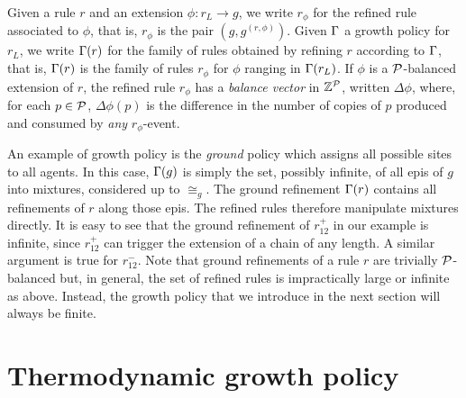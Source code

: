 \label{p:balance-vector}
Given a rule $r$ and an extension $\phi: r_L \to g$, %
we write $r_\phi$ for the refined rule associated to $\phi$,
that is, $r_\phi$ is the pair $(g,g^{(r,\phi)})$.
%
Given $\Gamma$ a growth policy for $r_L$,
we write $\Gamma(r)$ for the family of rules
obtained by refining $r$ according to $\Gamma$,
that is, $\Gamma(r)$ is the family of rules $r_\phi$
for $\phi$ ranging in $\Gamma(r_L)$.
If $\phi$ is a $\mathcal{P}$-balanced extension of $r$,
the refined rule $r_\phi$ has a \emph{balance vector}
in $\mathbb{Z}^{\mathcal{P}}$, written $\Delta\phi$,
where, for each $p \in \mathcal{P}$,
$\Delta\phi(p)$ is the difference in the number of copies of $p$
produced and consumed by \emph{any} $r_\phi$-event.

An example of growth policy is the \emph{ground} policy
which assigns all possible sites to all agents.
In this case, $\Gamma(g)$ is simply the set, possibly infinite,
of all epis of $g$ into mixtures, considered up to $\cong_g$.
The ground refinement $\Gamma(r)$ %
contains all refinements of $r$ along those epis.
The refined rules therefore manipulate mixtures directly.
It is easy to see that the ground refinement of $r^+_{12}$
in our example is infinite,
since $r^+_{12}$ %
can trigger the extension of a chain of any length.
A similar argument is true for $r^-_{12}$.
Note that ground refinements of a rule $r$
are trivially $\mathcal{P}$-balanced but, in general,
the set of refined rules is impractically large or infinite as above.
Instead, the growth policy that we introduce
in the next section %
will always be finite.


\section{Thermodynamic growth policy} %
\label{sec:energy-gp}

